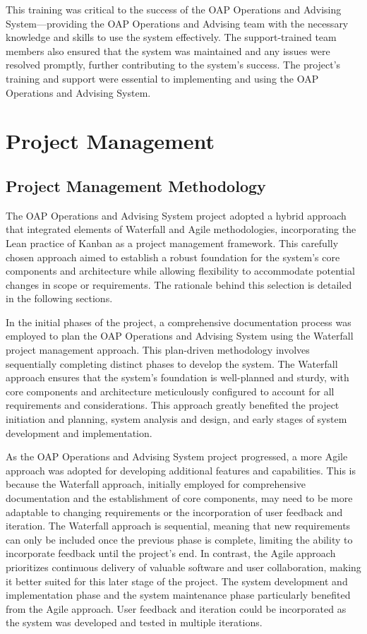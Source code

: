 \documentclass[12pt]{article}
\begin{document}
This training was critical to the success of the OAP Operations and Advising System—providing the OAP Operations and Advising team with the necessary knowledge and skills to use the system effectively. The support-trained team members also ensured that the system was maintained and any issues were resolved promptly, further contributing to the system's success. The project's training and support were essential to implementing and using the OAP Operations and Advising System.

\section{Project Management}
\subsection{Project Management Methodology} 
The OAP Operations and Advising System project adopted a hybrid approach that integrated elements of Waterfall and Agile methodologies, incorporating the Lean practice of Kanban as a project management framework. This carefully chosen approach aimed to establish a robust foundation for the system's core components and architecture while allowing flexibility to accommodate potential changes in scope or requirements. The rationale behind this selection is detailed in the following sections.

In the initial phases of the project, a comprehensive documentation process was employed to plan the OAP Operations and Advising System using the Waterfall project management approach. This plan-driven methodology involves sequentially completing distinct phases to develop the system. The Waterfall approach ensures that the system's foundation is well-planned and sturdy, with core components and architecture meticulously configured to account for all requirements and considerations. This approach greatly benefited the project initiation and planning, system analysis and design, and early stages of system development and implementation.

As the OAP Operations and Advising System project progressed, a more Agile approach was adopted for developing additional features and capabilities. This is because the Waterfall approach, initially employed for comprehensive documentation and the establishment of core components, may need to be more adaptable to changing requirements or the incorporation of user feedback and iteration. The Waterfall approach is sequential, meaning that new requirements can only be included once the previous phase is complete, limiting the ability to incorporate feedback until the project's end. In contrast, the Agile approach prioritizes continuous delivery of valuable software and user collaboration, making it better suited for this later stage of the project. The system development and implementation phase and the system maintenance phase particularly benefited from the Agile approach. User feedback and iteration could be incorporated as the system was developed and tested in multiple iterations.
\end{document}
